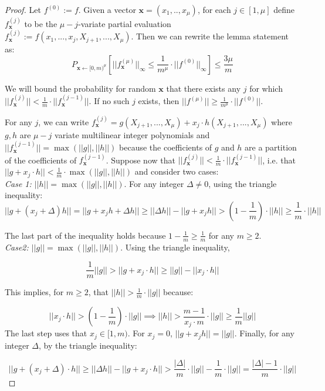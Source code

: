  \begin{proof}
 Let $f^{(0)}:=f$. 
 Given a vector $\mathbf{x} = (x_1,..,x_\mu)$, for each $j\in[1,\mu]$ define $f_{\mathbf{x}}^{(j)}$ to be the $\mu-j$-variate partial evaluation $f_{\mathbf{x}}^{(j)}:= f(x_1,...,x_j, X_{j+1},...,X_\mu)$. Then we can rewrite the lemma statement as:
    $$P_{\mathbf{x} \gets [0,m)^\mu} [||f_{\mathbf{x}}^{(\mu)}||_\infty\leq  \frac{1}{m^\mu} \cdot ||f^{(0)}||_\infty ]\leq\frac{ 3\mu}{m}$$	
 
We will bound the probability for random $\mathbf{x}$ that there exists any $j$ for which $||f_{\mathbf{x}}^{(j)}|| < \frac{1}{m} \cdot ||f_{\mathbf{x}}^{(j-1)}||$. If no such $j$ exists, then $||f^{(\mu)}|| \geq \frac{1}{m^\mu} \cdot ||f^{(0)}||$. 

For any $j$, we can write $f_{\mathbf{x}}^{(j)} = g(X_{j+1},...,X_\mu) + x_{j}\cdot h(X_{j+1},...,X_\mu)$ where $g,h$ are $\mu-j$ variate multilinear integer polynomials and $||f_{\mathbf{x}}^{(j-1)}|| = \max(||g||, ||h||)$ because the coefficients of $g$ and $h$ are a partition of the coefficients of $f_{\mathbf{x}}^{(j-1)}$.  Suppose now that $||f_{\mathbf{x}}^{(j)}|| < \frac{1}{m} \cdot ||f_{\mathbf{x}}^{(j-1)}||$, i.e. that $||g + x_j \cdot h|| < \frac{1}{m} \cdot \max(||g||, ||h||)$ and consider two cases: \\

\emph{Case 1: $||h|| = \max(||g||, ||h||)$}.  For any integer $\Delta \neq 0$, using the triangle inequality: 
$$||g+(x_j +\Delta) h ||=||g + x_j h +\Delta h||\geq  ||\Delta h|| -  ||g + x_j h|| >  (1 - \frac{1}{m}) \cdot ||h|| \geq \frac{1}{m} \cdot ||h||   $$

The last part of the inequality holds because $1 - \frac{1}{m} \geq \frac{1}{m}$ for any $m \geq 2$. \\

\emph{Case2: $||g|| = \max(||g||, ||h||)$}. Using the triangle inequality, 

$$\frac{1}{m} ||g|| > ||g+x_j \cdot h || \geq  ||g|| - ||x_j \cdot h||$$ 

This implies, for $m \geq 2$, that $||h|| > \frac{1}{m} \cdot ||g||$ because:

$$||x_j \cdot h|| > (1 - \frac{1}{m}) \cdot ||g||\implies ||h||> \frac{m-1}{x_j \cdot m} \cdot ||g||\geq \frac{1}{m} ||g||$$
The last step uses that $x_j\in [1,m)$. For $x_j=0$, $||g +x_j h||=||g||$. 
Finally, for any integer $\Delta$, by the triangle inequality: 

$$||g + (x_j + \Delta) \cdot h|| \geq || \Delta h|| - ||g + x_j \cdot h|| > \frac{|\Delta|}{m} \cdot ||g||  - \frac{1}{m} \cdot ||g||  = \frac{|\Delta| -1}{m} \cdot ||g||$$ 


\end{proof}

